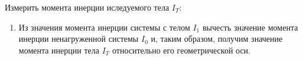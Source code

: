 \item Измерить момента инерции иследуемого тела $I_T$:
    \begin{enumerate}
        \item Из значения момента инерции системы с телом $I_1$
        вычесть значение момента инерции ненагруженной системы $I_0$ и,
        таким образом, получим значение момента инерции тела $I_T$
        относительно его геометрической оси. 
    \end{enumerate}